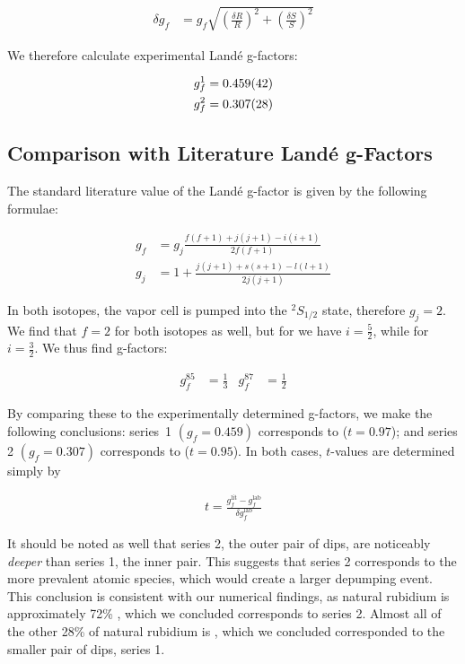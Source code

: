 \documentclass[letter]{article}
\begin{document}
\begin{align*}
	\delta g_f &= g_f \sqrt{\left(\frac{\delta R}{R}\right)^2 + \left(\frac{\delta S}{S}\right)^2}
\end{align*}

We therefore calculate experimental Land{\'e} g-factors:

\begin{align*}
	g_f^1 &= \num{0.459 \pm 0.042} \\
	g_f^2 &= \num{0.307 \pm 0.028}
\end{align*}


\vspace{0.5in}
\subsection{Comparison with Literature Land{\'e} g-Factors}

The standard literature value of the Land{\'e} g-factor is given by the following formulae:

\begin{align*}
	g_f &= g_j\frac{f(f+1) + j(j+1) - i(i+1)}{2f(f+1)} \\
	g_j &= 1 + \frac{j(j+1) + s(s+1) - l(l+1)}{2j(j+1)}
\end{align*}

In both isotopes, the vapor cell is pumped into the ${}^2 S_{1/2}$ state, therefore $g_j = 2$. We find that $f=2$ for both isotopes as well, but for  we have $i = \frac{5}{2}$, while for  $i = \frac{3}{2}$. We thus find g-factors:

\begin{align*}
	g_f^{85} &= \frac{1}{3} &
	g_f^{87} &= \frac{1}{2}
\end{align*}

By comparing these to the experimentally determined g-factors, we make the following conclusions: series~1 $(g_f = \num{0.459})$ corresponds to  ($t = \num{0.97}$); and series 2 $(g_f = \num{0.307})$ corresponds to  ($t = \num{0.95}$). In both cases, $t$-values are determined simply by 

\begin{align*}
	t = \frac{g_f^{\text{lit}} - g_f^{\text{lab}}}{\delta g_f^{\text{lab}}}
\end{align*}

It should be noted as well that series 2, the outer pair of dips, are noticeably \textit{deeper} than series 1, the inner pair. This suggests that series 2 corresponds to the more prevalent atomic species, which would create a larger depumping event. This conclusion is consistent with our numerical findings, as natural rubidium is approximately 72\% , which we concluded corresponds to series 2. Almost all of the other 28\% of natural rubidium is , which we concluded corresponded to the smaller pair of dips, series 1.
\end{document}
